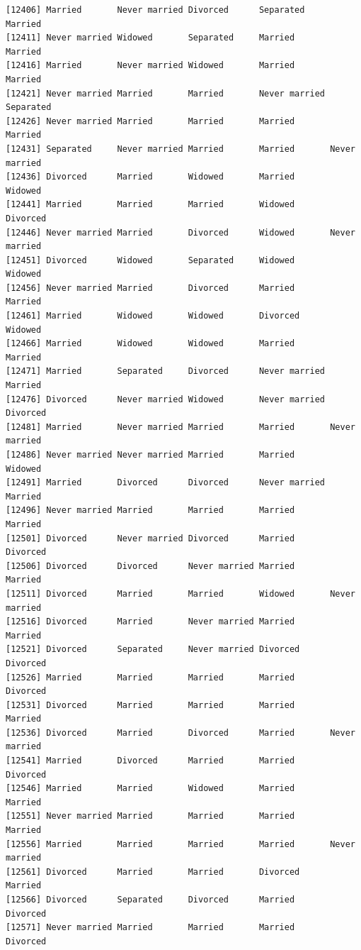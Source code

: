 \documentclass[
  letterpaper,
  DIV=11,
  numbers=noendperiod,
  oneside]{scrartcl}
\begin{document}
\begin{verbatim}
[12406] Married       Never married Divorced      Separated     Married      
[12411] Never married Widowed       Separated     Married       Married      
[12416] Married       Never married Widowed       Married       Married      
[12421] Never married Married       Married       Never married Separated    
[12426] Never married Married       Married       Married       Married      
[12431] Separated     Never married Married       Married       Never married
[12436] Divorced      Married       Widowed       Married       Widowed      
[12441] Married       Married       Married       Widowed       Divorced     
[12446] Never married Married       Divorced      Widowed       Never married
[12451] Divorced      Widowed       Separated     Widowed       Widowed      
[12456] Never married Married       Divorced      Married       Married      
[12461] Married       Widowed       Widowed       Divorced      Widowed      
[12466] Married       Widowed       Widowed       Married       Married      
[12471] Married       Separated     Divorced      Never married Married      
[12476] Divorced      Never married Widowed       Never married Divorced     
[12481] Married       Never married Married       Married       Never married
[12486] Never married Never married Married       Married       Widowed      
[12491] Married       Divorced      Divorced      Never married Married      
[12496] Never married Married       Married       Married       Married      
[12501] Divorced      Never married Divorced      Married       Divorced     
[12506] Divorced      Divorced      Never married Married       Married      
[12511] Divorced      Married       Married       Widowed       Never married
[12516] Divorced      Married       Never married Married       Married      
[12521] Divorced      Separated     Never married Divorced      Divorced     
[12526] Married       Married       Married       Married       Divorced     
[12531] Divorced      Married       Married       Married       Married      
[12536] Divorced      Married       Divorced      Married       Never married
[12541] Married       Divorced      Married       Married       Divorced     
[12546] Married       Married       Widowed       Married       Married      
[12551] Never married Married       Married       Married       Married      
[12556] Married       Married       Married       Married       Never married
[12561] Divorced      Married       Married       Divorced      Married      
[12566] Divorced      Separated     Divorced      Married       Divorced     
[12571] Never married Married       Married       Married       Divorced     

\end{verbatim}
\end{document}
